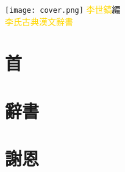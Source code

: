 \documentclass[a5paper,11pt]{report}
\begin{document}
\begin{titlepage}
\doublespacing
\hfill
\vfill
\hspace{-40mm}
\texttt{[image: cover.png]}
\vfill
{\textcolor{gold}{李世鎬}\hspace{14pt}編}\\
\vspace{14pt}
{\huge\textcolor{gold}{李氏古典漢文辭書}}
\vfill
\end{titlepage}
\newpage
\chapter*{首}
\doublespacing


\chapter*{辭書}
\begin{multicols}{2}
\begin{flushleft}
\onehalfspacing

\end{flushleft}
\end{multicols}

\chapter*{謝恩}
\doublespacing

\end{document}
